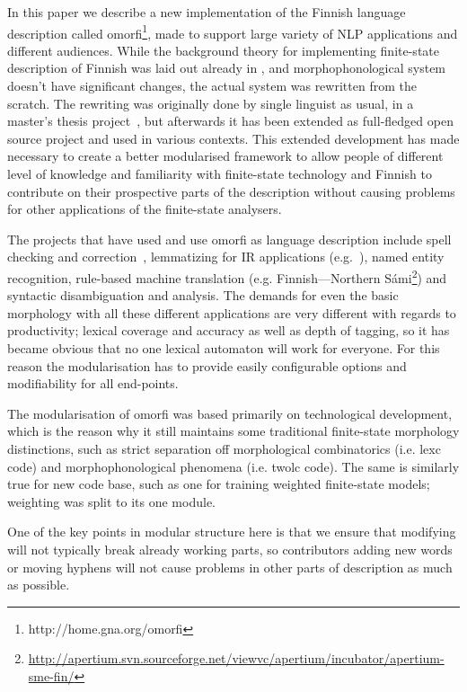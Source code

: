 \documentclass[11pt]{article}
\begin{document}
In this paper we describe a new implementation of the Finnish language
description called omorfi\footnote{http://home.gna.org/omorfi}, made to support
large variety of NLP applications and different audiences.  While the
background theory for implementing finite-state description of Finnish was laid
out already in , and morphophonological system
doesn't have significant changes, the actual system was rewritten from the
scratch. The rewriting was originally done by single linguist as usual, in a
master's thesis project~\cite{pirinen/2008}, but afterwards it has been
extended as full-fledged open source project and used in various contexts. This
extended development has made necessary to create a better modularised
framework to allow people of different level of knowledge and familiarity with
finite-state technology and Finnish to contribute on their prospective parts of
the description without causing problems for other applications of the
finite-state analysers.

The projects that have used and use omorfi as language description include
spell checking and correction~\cite{pirinen/2010/lrec}, lemmatizing for IR
applications (e.g.~), named entity recognition, rule-based
machine translation (e.g. Finnish---Northern
Sámi\footnote{\url{http://apertium.svn.sourceforge.net/viewvc/apertium/incubator/apertium-sme-fin/}})
and syntactic disambiguation and analysis. The demands for even the basic
morphology with all these different applications are very different with
regards to productivity; lexical coverage and accuracy as well as depth of
tagging, so it has became obvious that no one lexical automaton will work for
everyone.  For this reason the modularisation has to provide easily
configurable options and modifiability for all end-points.

The modularisation of omorfi was based primarily on technological development,
which is the reason why it still maintains some traditional finite-state
morphology distinctions, such as strict separation off morphological
combinatorics (i.e. lexc code) and morphophonological phenomena (i.e.
twolc code). The same is similarly true for new code base, such as one for
training weighted finite-state models; weighting was split to its one
module.

One of the key points in modular structure here is that we ensure that modifying
will not typically break already working parts, so contributors adding new words
or moving hyphens will not cause problems in other parts of description
as much as possible.
\end{document}
